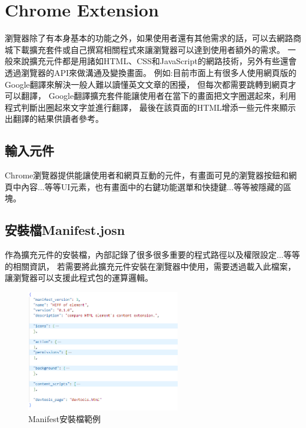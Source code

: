 \section{Chrome Extension}\label{s2.6}

瀏覽器除了有本身基本的功能之外，如果使用者還有其他需求的話，可以去網路商城下載擴充套件或自己撰寫相關程式來讓瀏覽器可以達到使用者額外的需求。
一般來說擴充元件都是用諸如HTML、CSS和JavaScript的網路技術，另外有些還會透過瀏覽器的API來做溝通及變換畫面。
例如:目前市面上有很多人使用網頁版的Google翻譯來解決一般人難以讀懂英文文章的困擾，
但每次都需要跳轉到網頁才可以翻譯，
Google翻譯擴充套件能讓使用者在當下的畫面把文字圈選起來，利用程式判斷出圈起來文字並進行翻譯，
最後在該頁面的HTML增添一些元件來顯示出翻譯的結果供讀者參考。

\subsection{輸入元件}\label{s2.6.1}
Chrome瀏覽器提供能讓使用者和網頁互動的元件，有畫面可見的瀏覽器按鈕和網頁中內容...等等UI元素，也有畫面中的右鍵功能選單和快捷鍵...等等被隱藏的區塊。

\subsection{安裝檔Manifest.josn}\label{s2.6.2}
作為擴充元件的安裝檔，內部記錄了很多很多重要的程式路徑以及權限設定...等等的相關資訊，
若需要將此擴充元件安裝在瀏覽器中使用，需要透過載入此檔案，讓瀏覽器可以支援此程式包的運算邏輯。

\begin{figure}[H]
    \centering
    \includegraphics[width=0.6\textwidth]{picture/ch2-manifest.png}
    \caption{Manifest安裝檔範例}
    \label{f2.4}
\end{figure}

